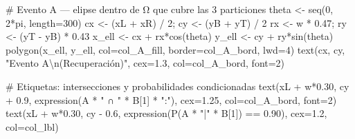 \documentclass[
  letterpaper,
  DIV=11,
  numbers=noendperiod]{scrartcl}
\newenvironment{Shaded}{\begin{snugshade}}{\end{snugshade}}
\newcommand{\AttributeTok}[1]{\textcolor[rgb]{0.40,0.45,0.13}{#1}}
\newcommand{\CommentTok}[1]{\textcolor[rgb]{0.37,0.37,0.37}{#1}}
\newcommand{\DecValTok}[1]{\textcolor[rgb]{0.68,0.00,0.00}{#1}}
\newcommand{\FloatTok}[1]{\textcolor[rgb]{0.68,0.00,0.00}{#1}}
\newcommand{\FunctionTok}[1]{\textcolor[rgb]{0.28,0.35,0.67}{#1}}
\newcommand{\NormalTok}[1]{\textcolor[rgb]{0.00,0.23,0.31}{#1}}
\newcommand{\OtherTok}[1]{\textcolor[rgb]{0.00,0.23,0.31}{#1}}
\newcommand{\SpecialCharTok}[1]{\textcolor[rgb]{0.37,0.37,0.37}{#1}}
\newcommand{\StringTok}[1]{\textcolor[rgb]{0.13,0.47,0.30}{#1}}
\begin{document}
\begin{Shaded}
\begin{Highlighting}[]
\CommentTok{\# Evento A — elipse dentro de Ω que cubre las 3 particiones}
\NormalTok{theta }\OtherTok{\textless{}{-}} \FunctionTok{seq}\NormalTok{(}\DecValTok{0}\NormalTok{, }\DecValTok{2}\SpecialCharTok{*}\NormalTok{pi, }\AttributeTok{length=}\DecValTok{300}\NormalTok{)}
\NormalTok{cx }\OtherTok{\textless{}{-}}\NormalTok{ (xL }\SpecialCharTok{+}\NormalTok{ xR) }\SpecialCharTok{/} \DecValTok{2}\NormalTok{; cy }\OtherTok{\textless{}{-}}\NormalTok{ (yB }\SpecialCharTok{+}\NormalTok{ yT) }\SpecialCharTok{/} \DecValTok{2}
\NormalTok{rx }\OtherTok{\textless{}{-}}\NormalTok{ w }\SpecialCharTok{*} \FloatTok{0.47}\NormalTok{; ry }\OtherTok{\textless{}{-}}\NormalTok{ (yT }\SpecialCharTok{{-}}\NormalTok{ yB) }\SpecialCharTok{*} \FloatTok{0.43}
\NormalTok{x\_ell }\OtherTok{\textless{}{-}}\NormalTok{ cx }\SpecialCharTok{+}\NormalTok{ rx}\SpecialCharTok{*}\FunctionTok{cos}\NormalTok{(theta)}
\NormalTok{y\_ell }\OtherTok{\textless{}{-}}\NormalTok{ cy }\SpecialCharTok{+}\NormalTok{ ry}\SpecialCharTok{*}\FunctionTok{sin}\NormalTok{(theta)}
\FunctionTok{polygon}\NormalTok{(x\_ell, y\_ell, }\AttributeTok{col=}\NormalTok{col\_A\_fill, }\AttributeTok{border=}\NormalTok{col\_A\_bord, }\AttributeTok{lwd=}\DecValTok{4}\NormalTok{)}
\FunctionTok{text}\NormalTok{(cx, cy, }\StringTok{"Evento A}\SpecialCharTok{\textbackslash{}n}\StringTok{(Recuperación)"}\NormalTok{, }\AttributeTok{cex=}\FloatTok{1.3}\NormalTok{, }\AttributeTok{col=}\NormalTok{col\_A\_bord, }\AttributeTok{font=}\DecValTok{2}\NormalTok{)}

\CommentTok{\# Etiquetas: intersecciones y probabilidades condicionadas}
\FunctionTok{text}\NormalTok{(xL }\SpecialCharTok{+}\NormalTok{ w}\SpecialCharTok{*}\FloatTok{0.30}\NormalTok{, cy }\SpecialCharTok{+} \FloatTok{0.9}\NormalTok{, }\FunctionTok{expression}\NormalTok{(A }\SpecialCharTok{*} \StringTok{" ∩ "} \SpecialCharTok{*}\NormalTok{ B[}\DecValTok{1}\NormalTok{] }\SpecialCharTok{*} \StringTok{":"}\NormalTok{), }\AttributeTok{cex=}\FloatTok{1.25}\NormalTok{, }\AttributeTok{col=}\NormalTok{col\_A\_bord, }\AttributeTok{font=}\DecValTok{2}\NormalTok{)}
\FunctionTok{text}\NormalTok{(xL }\SpecialCharTok{+}\NormalTok{ w}\SpecialCharTok{*}\FloatTok{0.30}\NormalTok{, cy }\SpecialCharTok{{-}} \FloatTok{0.6}\NormalTok{, }\FunctionTok{expression}\NormalTok{(}\FunctionTok{P}\NormalTok{(A }\SpecialCharTok{*} \StringTok{"|"} \SpecialCharTok{*}\NormalTok{ B[}\DecValTok{1}\NormalTok{]) }\SpecialCharTok{==} \FloatTok{0.90}\NormalTok{), }\AttributeTok{cex=}\FloatTok{1.2}\NormalTok{, }\AttributeTok{col=}\NormalTok{col\_lbl)}


\end{Highlighting}
\end{Shaded}
\end{document}
